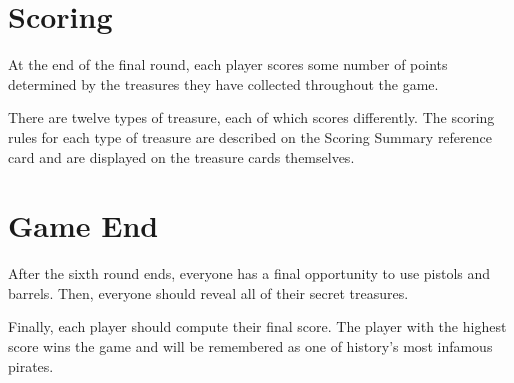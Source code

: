 \section*{Scoring}
At the end of the final round, each player scores some number of points determined by the treasures they have collected throughout the game.

There are twelve types of treasure, each of which scores differently.
The scoring rules for each type of treasure are described on the {\setmainfont{Tradewinds}\scriptsize Scoring Summary} reference card and are displayed on the treasure cards themselves.

\section*{Game End}
After the sixth round ends, everyone has a final opportunity to use pistols and barrels.
Then, everyone should reveal all of their secret treasures.

Finally, each player should compute their final score.
The player with the highest score wins the game and will be remembered as one of history's most infamous pirates.




